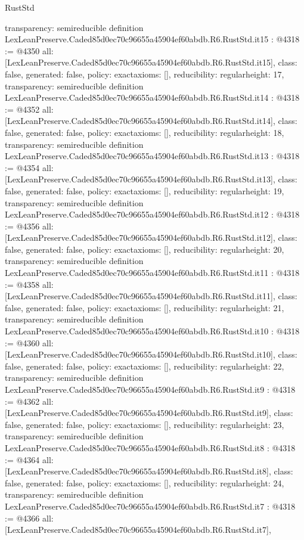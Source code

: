 \begin{lexlean}{RustStd}
\begin{coremodule}
{  transparency: semireducible
}
definition LexLeanPreserve.Caded85d0ec70c96655a45904ef60abdb.R6.RustStd.it15 : @4318 := @4350 {
  all: [LexLeanPreserve.Caded85d0ec70c96655a45904ef60abdb.R6.RustStd.it15],
  class: false,
  generated: false,
  policy: exact{axioms: []},
  reducibility: regular{height: 17},
  transparency: semireducible
}
definition LexLeanPreserve.Caded85d0ec70c96655a45904ef60abdb.R6.RustStd.it14 : @4318 := @4352 {
  all: [LexLeanPreserve.Caded85d0ec70c96655a45904ef60abdb.R6.RustStd.it14],
  class: false,
  generated: false,
  policy: exact{axioms: []},
  reducibility: regular{height: 18},
  transparency: semireducible
}
definition LexLeanPreserve.Caded85d0ec70c96655a45904ef60abdb.R6.RustStd.it13 : @4318 := @4354 {
  all: [LexLeanPreserve.Caded85d0ec70c96655a45904ef60abdb.R6.RustStd.it13],
  class: false,
  generated: false,
  policy: exact{axioms: []},
  reducibility: regular{height: 19},
  transparency: semireducible
}
definition LexLeanPreserve.Caded85d0ec70c96655a45904ef60abdb.R6.RustStd.it12 : @4318 := @4356 {
  all: [LexLeanPreserve.Caded85d0ec70c96655a45904ef60abdb.R6.RustStd.it12],
  class: false,
  generated: false,
  policy: exact{axioms: []},
  reducibility: regular{height: 20},
  transparency: semireducible
}
definition LexLeanPreserve.Caded85d0ec70c96655a45904ef60abdb.R6.RustStd.it11 : @4318 := @4358 {
  all: [LexLeanPreserve.Caded85d0ec70c96655a45904ef60abdb.R6.RustStd.it11],
  class: false,
  generated: false,
  policy: exact{axioms: []},
  reducibility: regular{height: 21},
  transparency: semireducible
}
definition LexLeanPreserve.Caded85d0ec70c96655a45904ef60abdb.R6.RustStd.it10 : @4318 := @4360 {
  all: [LexLeanPreserve.Caded85d0ec70c96655a45904ef60abdb.R6.RustStd.it10],
  class: false,
  generated: false,
  policy: exact{axioms: []},
  reducibility: regular{height: 22},
  transparency: semireducible
}
definition LexLeanPreserve.Caded85d0ec70c96655a45904ef60abdb.R6.RustStd.it9 : @4318 := @4362 {
  all: [LexLeanPreserve.Caded85d0ec70c96655a45904ef60abdb.R6.RustStd.it9],
  class: false,
  generated: false,
  policy: exact{axioms: []},
  reducibility: regular{height: 23},
  transparency: semireducible
}
definition LexLeanPreserve.Caded85d0ec70c96655a45904ef60abdb.R6.RustStd.it8 : @4318 := @4364 {
  all: [LexLeanPreserve.Caded85d0ec70c96655a45904ef60abdb.R6.RustStd.it8],
  class: false,
  generated: false,
  policy: exact{axioms: []},
  reducibility: regular{height: 24},
  transparency: semireducible
}
definition LexLeanPreserve.Caded85d0ec70c96655a45904ef60abdb.R6.RustStd.it7 : @4318 := @4366 {
  all: [LexLeanPreserve.Caded85d0ec70c96655a45904ef60abdb.R6.RustStd.it7],
}
\end{coremodule}
\end{lexlean}

